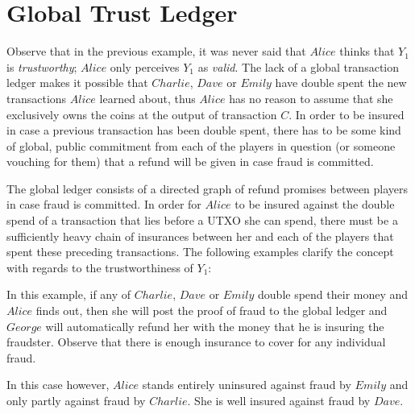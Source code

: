 \section{Global Trust Ledger}
  Observe that in the previous example, it was never said that $Alice$ thinks that $Y_1$
  is \textit{trustworthy}; $Alice$ only perceives $Y_1$ as \textit{valid}. The lack of a
  global transaction ledger makes it possible that $Charlie$, $Dave$ or $Emily$ have
  double spent the new transactions $Alice$ learned about, thus $Alice$ has no reason to
  assume that she exclusively owns the coins at the output of transaction $C$. In order to
  be insured in case a previous transaction has been double spent, there has to be some
  kind of global, public commitment from each of the players in question (or someone
  vouching for them) that a refund will be given in case fraud is committed.

  The global ledger consists of a directed graph of refund promises between players in
  case fraud is committed. In order for $Alice$ to be insured against the double spend of
  a transaction that lies before a UTXO she can spend, there must be a sufficiently heavy
  chain of insurances between her and each of the players that spent these preceding
  transactions. The following examples clarify the concept with regards to the
  trustworthiness of $Y_1$:
  \begin{center}
    \begin{dot2tex}[outputdir=dot2tex/, file=goodTrust]
      
    \end{dot2tex}
  \end{center}
  In this example, if any of $Charlie$, $Dave$ or $Emily$ double spend their money and
  $Alice$ finds out, then she will post the proof of fraud to the global ledger and
  $George$ will automatically refund her with the money that he is insuring the fraudster.
  Observe that there is enough insurance to cover for any individual fraud.

  \begin{center}
    \begin{dot2tex}[outputdir=dot2tex/, file=badTrust]
      
    \end{dot2tex}
  \end{center}
  In this case however, $Alice$ stands entirely uninsured against fraud by $Emily$ and
  only partly against fraud by $Charlie$. She is well insured against fraud by $Dave$.
